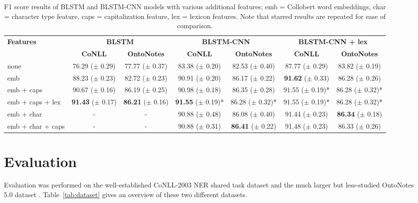 \documentclass[11pt,letterpaper]{article}
\begin{document}
\begin{table}[ht!]
\begin{center}
\footnotesize
\begin{tabular}{|l|c|c|c|c|c|c|}
\hline 
\multirow{2}{*}{\bf Features} & \multicolumn{2}{|c|}{\bf BLSTM} & \multicolumn{2}{|c|}{\bf BLSTM-CNN} & \multicolumn{2}{|c|}{\bf BLSTM-CNN + lex} \\ \cline{2-7}
& \bf CoNLL & \bf OntoNotes & \bf CoNLL & \bf OntoNotes & \bf CoNLL & \bf OntoNotes\\ \hline
none & 76.29 ($\pm$ 0.29) & 77.77 ($\pm$ 0.37) & 83.38 ($\pm$ 0.20) & 82.53 ($\pm$ 0.40) & 87.77 ($\pm$ 0.29) & 83.82 ($\pm$ 0.19) \\
emb & 88.23 ($\pm$ 0.23) & 82.72 ($\pm$ 0.23) & 90.91 ($\pm$ 0.20) & 86.17 ($\pm$ 0.22) & {\bf 91.62} ($\pm$ 0.33) & 86.28 ($\pm$ 0.26) \\
emb + caps       & 90.67 ($\pm$ 0.16) & 86.19 ($\pm$ 0.25) & 90.98 ($\pm$ 0.18) & 86.35 ($\pm$ 0.28) & 91.55 ($\pm$ 0.19)* & 86.28 ($\pm$ 0.32)* \\
emb + caps + lex & {\bf 91.43} ($\pm$ 0.17) & {\bf 86.21} ($\pm$ 0.16) & {\bf 91.55} ($\pm$ 0.19)* & 86.28 ($\pm$ 0.32)* & 91.55 ($\pm$ 0.19)* & 86.28 ($\pm$ 0.32)* \\ \hline
emb + char & \-- & \-- & 90.88 ($\pm$ 0.48) & 86.08 ($\pm$ 0.40) & 91.44 ($\pm$ 0.23) & {\bf 86.34} ($\pm$ 0.18) \\
emb + char + caps & \-- & \-- & 90.88 ($\pm$ 0.31) & {\bf 86.41} ($\pm$ 0.22) & 91.48 ($\pm$ 0.23) & 86.33 ($\pm$ 0.26) \\ \hline

\end{tabular}
\end{center}
\caption{F1 score results of BLSTM and BLSTM-CNN models with various additional features; emb = Collobert word embeddings, char = character type feature, caps = capitalization feature, lex = lexicon features. Note that starred results are repeated for ease of comparison.}
\label{tab:res-feat-no-cnn}
\end{table}

\section{Evaluation}

Evaluation was performed on the well-established CoNLL-2003 NER shared task dataset \cite{conll2003} and the much larger but less-studied OntoNotes 5.0 dataset \cite{ontonotes2006,pradhan2013}. Table~\ref{tab:dataset} gives an overview of these two different datasets.
\end{document}
